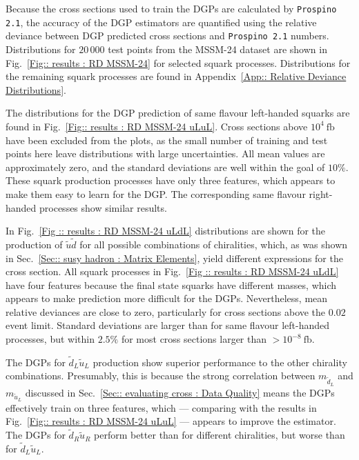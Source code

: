 \documentclass[twoside,english]{uiofysmaster}
\begin{document}
{{Because the cross sections used to train the DGPs are calculated by \verb|Prospino 2.1|, the accuracy of the DGP estimators are quantified using the relative deviance between DGP predicted cross sections and \verb|Prospino 2.1| numbers. Distributions for $20\,000$ test points from the MSSM-24 dataset are shown in Fig.~\ref{Fig:: results : RD MSSM-24} for selected squark processes. Distributions for the remaining squark processes are found in Appendix~\ref{App:: Relative Deviance Distributions}.

The distributions for the DGP prediction of same flavour left-handed squarks are found in Fig.~\ref{Fig:: results : RD MSSM-24 uLuL}. Cross sections above $10^4~\mathrm{fb}$ have been excluded from the plots, as the small number of training and test points here leave distributions with large uncertainties. All mean values are approximately zero, and the standard deviations are well within the goal of $10 \%$. These squark production processes have only three features, which appears to make them easy to learn for the DGP. The corresponding same flavour right-handed processes show similar results.

In Fig.~\ref{Fig :: results : RD MSSM-24 uLdL} distributions are shown for the production of $\widetilde{u} \widetilde{d}$ for all possible combinations of chiralities, which, as was shown in Sec.~\ref{Sec:: susy hadron : Matrix Elements}, yield different expressions for the cross section. All squark processes in Fig.~\ref{Fig :: results : RD MSSM-24 uLdL} have four features because the final state squarks have different masses, which appears to make prediction more difficult for the DGPs. Nevertheless, mean relative deviances are close to zero, particularly for cross sections above the $0.02$ event limit. Standard deviations are larger than for same flavour left-handed processes, but within $2.5\%$ for most cross sections larger than $> 10^{-8}~\mathrm{fb}$.



The DGPs for $\widetilde{d}_L \widetilde{u}_L$ production show superior performance to the other chirality combinations. Presumably, this is because the strong correlation between $m_{\widetilde{d}_L}$ and $m_{\widetilde{u}_L}$ discussed in Sec.~\ref{Sec:: evaluating cross : Data Quality} means the DGPs effectively train on three features, which --- comparing with the results in Fig.~\ref{Fig:: results : RD MSSM-24 uLuL} --- appears to improve the estimator. The DGPs for $\widetilde{d}_R \widetilde{u}_R$ perform better than for different chiralities, but worse than for $\widetilde{d}_L\widetilde{u}_L$.

}}
\end{document}
